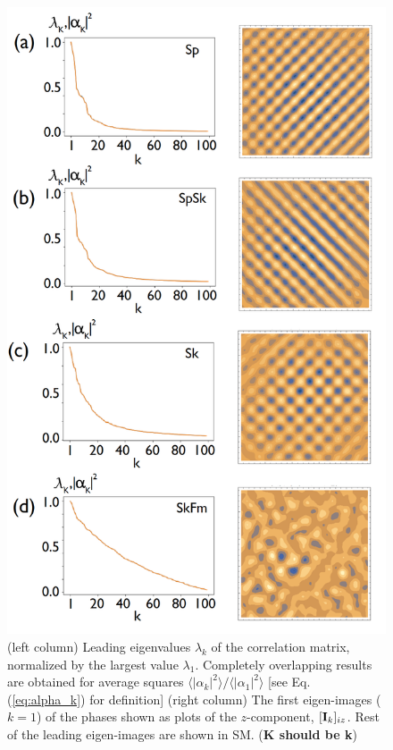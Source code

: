 \documentclass[reprint,amsmath,amssymb,aps,showpacs,superscriptaddress,prl]{revtex4-1}
\begin{document}
\begin{figure}[h]
\includegraphics[scale=0.3]{fig1.png}
\caption{(left column) Leading eigenvalues $\lambda_k$ of the correlation matrix, normalized by the largest value $\lambda_1$. Completely overlapping results are obtained for average squares $\langle |\alpha_k |^2 \rangle / \langle |\alpha_1 |^2 \rangle$ [see Eq. (\ref{eq:alpha_k}) for definition] (right column) The first eigen-images ($k=1$) of the phases shown as plots of the $z$-component, $[{\bf I}_k ]_{iz}$. Rest of the leading eigen-images are shown in SM. ({\bf K should be k}) }\label{fig:0}
\end{figure}
\end{document}
